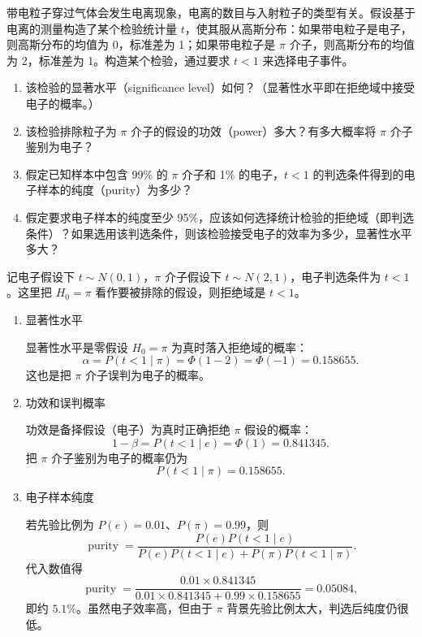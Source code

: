 ﻿





\begin{question}
带电粒子穿过气体会发生电离现象，电离的数目与入射粒子的类型有关。假设基于电离的测量构造了某个检验统计量
\(t\)，使其服从高斯分布：如果带电粒子是电子，则高斯分布的均值为
0，标准差为 1；如果带电粒子是 \(\pi\) 介子，则高斯分布的均值为
2，标准差为 1。构造某个检验，通过要求 \(t<1\) 来选择电子事件。

\begin{enumerate}
\item 该检验的显著水平（significance
level）如何？（显著性水平即在拒绝域中接受电子的概率。）

\item 该检验排除粒子为 \(\pi\)
介子的假设的功效（power）多大？有多大概率将 \(\pi\) 介子鉴别为电子？

\item 假定已知样本中包含 99\% 的 \(\pi\) 介子和 1\% 的电子，\(t<1\)
的判选条件得到的电子样本的纯度（purity）为多少？

\item 假定要求电子样本的纯度至少
95\%，应该如何选择统计检验的拒绝域（即判选条件）？如果选用该判选条件，则该检验接受电子的效率为多少，显著性水平多大？
\end{enumerate}
\begin{solution}
记电子假设下 \(t\sim N(0,1)\)，\(\pi\) 介子假设下
\(t\sim N(2,1)\)，电子判选条件为 \(t<1\)。这里把
\(H_0=\pi\) 看作要被排除的假设，则拒绝域是 \(t<1\)。

\begin{enumerate}
\item 显著性水平

显著性水平是零假设 \(H_0=\pi\) 为真时落入拒绝域的概率：
\[
\alpha=P(t<1\mid\pi)=\Phi(1-2)=\Phi(-1)=0.158655.
\]
这也是把 \(\pi\) 介子误判为电子的概率。

\item 功效和误判概率

功效是备择假设（电子）为真时正确拒绝 \(\pi\) 假设的概率：
\[
1-\beta=P(t<1\mid e)=\Phi(1)=0.841345.
\]
把 \(\pi\) 介子鉴别为电子的概率仍为
\[
P(t<1\mid\pi)=0.158655.
\]

\item 电子样本纯度

若先验比例为 \(P(e)=0.01\)、\(P(\pi)=0.99\)，则
\[
\operatorname{purity}
=\frac{P(e)P(t<1\mid e)}{P(e)P(t<1\mid e)+P(\pi)P(t<1\mid\pi)}.
\]
代入数值得
\[
\operatorname{purity}
=\frac{0.01\times0.841345}{0.01\times0.841345+0.99\times0.158655}
=0.05084,
\]
即约 \(5.1\%\)。虽然电子效率高，但由于 \(\pi\) 背景先验比例太大，判选后纯度仍很低。


\end{enumerate}
\end{solution}
\end{question}
